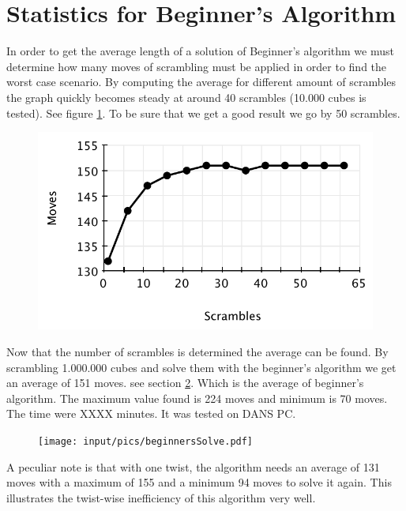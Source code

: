 \section{Statistics for Beginner's Algorithm}
\label{sec:beginnersStat}
In order to get the average length of a solution of Beginner's algorithm we must determine how many moves of scrambling must be applied in order to find the worst case scenario. 
By computing the average for different amount of scrambles the graph quickly becomes steady at around 40 scrambles (10.000 cubes is tested). See figure \ref{fig:beginnersScramble}. To be sure that we get a good result we go by 50 scrambles.
\begin{figure}[htbp]
	\centering
		\includegraphics{input/pics/beginnersScramble.pdf}
	\caption{}
	\label{fig:beginnersScramble}
\end{figure}

Now that the number of scrambles is determined the average can be found.
By scrambling 1.000.000 cubes and solve them with the beginner's algorithm we get an average of 151 moves. 
see section \ref{fig:beginnersSolve}. 
Which is the average of beginner's algorithm. 
The maximum value found is 224 moves and minimum is 70 moves. The time were XXXX minutes. It was tested on DANS PC. 

\begin{figure}[htbp]
	\centering
		\texttt{[image: input/pics/beginnersSolve.pdf]}
	\caption{}
	\label{fig:beginnersSolve}
\end{figure}

A peculiar note is that with one twist, the algorithm needs an average of 131 moves with a maximum of 155 and a minimum 94 moves to solve it again.
This illustrates the twist-wise inefficiency of this algorithm very well.


